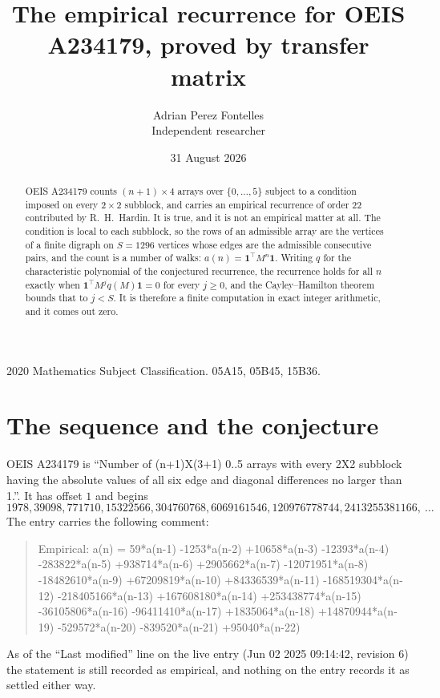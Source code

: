 \documentclass[11pt,a4paper]{article}
\title{The empirical recurrence for OEIS A234179, proved by transfer matrix}
\author{Adrian Perez Fontelles\\ \small Independent researcher}
\date{31 August 2026}
\theoremstyle{plain}
\theoremstyle{definition}
\begin{document}
\maketitle

\begin{abstract}
OEIS A234179 counts $(n+1)\times4$ arrays over $\{0,\dots,5\}$ subject to a condition imposed on
every $2\times2$ subblock, and carries an empirical recurrence of order $22$ contributed
by R.~H.~Hardin. It is true, and it is not an empirical matter at all. The condition is local
to each subblock, so the rows of an admissible array are the vertices of a finite digraph
on $S=1296$ vertices whose edges are the admissible consecutive pairs, and the count is a
number of walks: $a(n)=\mathbf{1}^{\!\top}M^{n}\mathbf{1}$. Writing $q$
for the characteristic polynomial of the conjectured recurrence, the recurrence holds for all
$n$ exactly when $\mathbf{1}^{\!\top}M^{j}q(M)\mathbf{1}=0$ for every $j\ge0$, and the
Cayley--Hamilton theorem bounds that to $j<S$. It is therefore a finite computation in exact
integer arithmetic, and it comes out zero.
\end{abstract}

\noindent\small 2020 Mathematics Subject Classification. 05A15, 05B45, 15B36.\normalsize

\section{The sequence and the conjecture}

OEIS A234179 is ``Number of (n+1)X(3+1) 0..5 arrays with every 2X2 subblock having the absolute values of all six edge and diagonal differences no larger than 1.''. It has offset $1$ and begins
\[
1978, 39098, 771710, 15322566, 304760768, 6069161546, 120976778744, 2413255381166,\ \dots
\]
The entry carries the following comment:
\begin{quote}\small
Empirical: a(n) = 59*a(n-1) -1253*a(n-2) +10658*a(n-3) -12393*a(n-4) -283822*a(n-5) +938714*a(n-6) +2905662*a(n-7) -12071951*a(n-8) -18482610*a(n-9) +67209819*a(n-10) +84336539*a(n-11) -168519304*a(n-12) -218405166*a(n-13) +167608180*a(n-14) +253438774*a(n-15) -36105806*a(n-16) -96411410*a(n-17) +1835064*a(n-18) +14870944*a(n-19) -529572*a(n-20) -839520*a(n-21) +95040*a(n-22)
\end{quote}
As of the ``Last modified'' line on the live entry (Jun 02 2025 09:14:42, revision 6) the statement is
still recorded as empirical, and nothing on the entry records it as settled either way.
\end{document}
